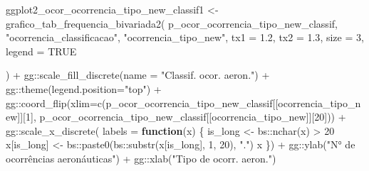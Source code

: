 \documentclass[
]{article}
\newenvironment{Shaded}{\begin{snugshade}}{\end{snugshade}}
\newcommand{\AttributeTok}[1]{\textcolor[rgb]{0.77,0.63,0.00}{#1}}
\newcommand{\ConstantTok}[1]{\textcolor[rgb]{0.00,0.00,0.00}{#1}}
\newcommand{\ControlFlowTok}[1]{\textcolor[rgb]{0.13,0.29,0.53}{\textbf{#1}}}
\newcommand{\DecValTok}[1]{\textcolor[rgb]{0.00,0.00,0.81}{#1}}
\newcommand{\FloatTok}[1]{\textcolor[rgb]{0.00,0.00,0.81}{#1}}
\newcommand{\FunctionTok}[1]{\textcolor[rgb]{0.00,0.00,0.00}{#1}}
\newcommand{\NormalTok}[1]{#1}
\newcommand{\OtherTok}[1]{\textcolor[rgb]{0.56,0.35,0.01}{#1}}
\newcommand{\SpecialCharTok}[1]{\textcolor[rgb]{0.00,0.00,0.00}{#1}}
\newcommand{\StringTok}[1]{\textcolor[rgb]{0.31,0.60,0.02}{#1}}
\begin{document}
\begin{Shaded}
\begin{Highlighting}[]
\NormalTok{ggplot2\_ocor\_ocorrencia\_tipo\_new\_classif1 }\OtherTok{\textless{}{-}} \FunctionTok{grafico\_tab\_frequencia\_bivariada2}\NormalTok{(}
\NormalTok{    p\_ocor\_ocorrencia\_tipo\_new\_classif,}
    \StringTok{"ocorrencia\_classificacao"}\NormalTok{,}
    \StringTok{"ocorrencia\_tipo\_new"}\NormalTok{,}
    \AttributeTok{tx1 =} \FloatTok{1.2}\NormalTok{,}
    \AttributeTok{tx2 =} \FloatTok{1.3}\NormalTok{,}
    \AttributeTok{size =} \DecValTok{3}\NormalTok{,}
    \AttributeTok{legend =} \ConstantTok{TRUE}
    
\NormalTok{) }\SpecialCharTok{+}\NormalTok{ gg}\SpecialCharTok{::}\FunctionTok{scale\_fill\_discrete}\NormalTok{(}\AttributeTok{name =} \StringTok{"Classif. ocor. aeron."}\NormalTok{) }\SpecialCharTok{+}
\NormalTok{    gg}\SpecialCharTok{::}\FunctionTok{theme}\NormalTok{(}\AttributeTok{legend.position=}\StringTok{"top"}\NormalTok{) }\SpecialCharTok{+} 
\NormalTok{    gg}\SpecialCharTok{::}\FunctionTok{coord\_flip}\NormalTok{(}\AttributeTok{xlim=}\FunctionTok{c}\NormalTok{(p\_ocor\_ocorrencia\_tipo\_new\_classif[[}\StringTok{\textquotesingle{}ocorrencia\_tipo\_new\textquotesingle{}}\NormalTok{]][}\DecValTok{1}\NormalTok{],}
\NormalTok{                         p\_ocor\_ocorrencia\_tipo\_new\_classif[[}\StringTok{\textquotesingle{}ocorrencia\_tipo\_new\textquotesingle{}}\NormalTok{]][}\DecValTok{20}\NormalTok{])) }\SpecialCharTok{+}
\NormalTok{    gg}\SpecialCharTok{::}\FunctionTok{scale\_x\_discrete}\NormalTok{(}
  \AttributeTok{labels =} \ControlFlowTok{function}\NormalTok{(x) \{}
\NormalTok{        is\_long }\OtherTok{\textless{}{-}}\NormalTok{ bs}\SpecialCharTok{::}\FunctionTok{nchar}\NormalTok{(x) }\SpecialCharTok{\textgreater{}} \DecValTok{20}
\NormalTok{        x[is\_long] }\OtherTok{\textless{}{-}}\NormalTok{ bs}\SpecialCharTok{::}\FunctionTok{paste0}\NormalTok{(bs}\SpecialCharTok{::}\FunctionTok{substr}\NormalTok{(x[is\_long], }\DecValTok{1}\NormalTok{, }\DecValTok{20}\NormalTok{), }\StringTok{"."}\NormalTok{)}
\NormalTok{        x}
\NormalTok{      \}) }\SpecialCharTok{+}
\NormalTok{    gg}\SpecialCharTok{::}\FunctionTok{ylab}\NormalTok{(}\StringTok{"N° de ocorrências aeronáuticas"}\NormalTok{) }\SpecialCharTok{+}
\NormalTok{    gg}\SpecialCharTok{::}\FunctionTok{xlab}\NormalTok{(}\StringTok{"Tipo de ocorr. aeron."}\NormalTok{)}
\end{Highlighting}
\end{Shaded}
\end{document}
